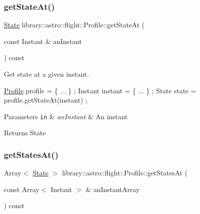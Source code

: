 \subsubsection{\texorpdfstring{get\+State\+At()}{getStateAt()}}
{\footnotesize\ttfamily \hyperlink{classlibrary_1_1astro_1_1flight_1_1profile_1_1_state}{State} library\+::astro\+::flight\+::\+Profile\+::get\+State\+At (\begin{DoxyParamCaption}\item[{const Instant \&}]{an\+Instant }\end{DoxyParamCaption}) const}



Get state at a given instant. 


\begin{DoxyCode}
\hyperlink{classlibrary_1_1astro_1_1flight_1_1_profile_a34d66fdddf3eda9a3fed036d6b9a4363}{Profile} profile = \{ ... \} ;
Instant instant = \{ ... \} ;
State state = profile.getStateAt(instant) ;
\end{DoxyCode}



\begin{DoxyParams}[1]{Parameters}
\mbox{\tt in}  & {\em an\+Instant} & An instant \\
\hline
\end{DoxyParams}
\begin{DoxyReturn}{Returns}
State 
\end{DoxyReturn}
\mbox{\label{classlibrary_1_1astro_1_1flight_1_1_profile_a20972a5b1104ed335d995c5a02db5db7}} 
\subsubsection{\texorpdfstring{get\+States\+At()}{getStatesAt()}}
{\footnotesize\ttfamily Array$<$ \hyperlink{classlibrary_1_1astro_1_1flight_1_1profile_1_1_state}{State} $>$ library\+::astro\+::flight\+::\+Profile\+::get\+States\+At (\begin{DoxyParamCaption}\item[{const Array$<$ Instant $>$ \&}]{an\+Instant\+Array }\end{DoxyParamCaption}) const}



